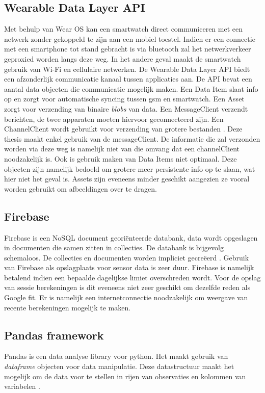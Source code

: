 \subsection{Wearable Data Layer API}
Met behulp van Wear OS kan een smartwatch direct communiceren met een netwerk zonder gekoppeld te zijn aan een mobiel toestel. Indien er een connectie met een smartphone tot stand gebracht is via bluetooth zal het netwerkverkeer geproxied worden langs deze weg. In het andere geval maakt de smartwatch gebruik van Wi-Fi en cellulaire netwerken.
De Wearable Data Layer API biedt een afzonderlijk communicatie kanaal tussen applicaties aan. 
De API bevat een aantal data objecten die communicatie mogelijk maken. Een Data Item slaat info op en zorgt voor automatische syncing tussen gsm en smartwatch. Een Asset zorgt voor verzending van binaire \textit{blobs} van data. Een MessageClient verzendt berichten, de twee apparaten moeten hiervoor geconnecteerd zijn. Een ChannelClient wordt gebruikt voor verzending van grotere bestanden \cite{ref26}.
Deze thesis maakt enkel gebruik van de messageClient. De informatie die zal verzonden worden via deze weg is namelijk niet van die omvang dat een channelClient noodzakelijk is. Ook is gebruik maken van Data Items niet optimaal. Deze objecten zijn namelijk bedoeld om grotere meer persistente info op te slaan, wat hier niet het geval is. Assets zijn eveneens minder geschikt aangezien ze vooral worden gebruikt om afbeeldingen over te dragen.

\subsection{Firebase}
Firebase is een NoSQL document georiënteerde databank, data wordt opgeslagen in documenten die samen zitten in collecties. De databank is bijgevolg schemaloos. De collecties en documenten worden impliciet gecreëerd \cite{ref61}.
Gebruik van Firebase als opslagplaats voor sensor data is zeer duur. Firebase is namelijk betalend indien een bepaalde dagelijkse limiet overschreden wordt. Voor de opslag van sessie berekeningen is dit eveneens niet zeer geschikt om dezelfde reden als Google fit. Er is namelijk een internetconnectie noodzakelijk om weergave van recente berekeningen mogelijk te maken.

\subsection{Pandas framework}
Pandas is een data analyse library voor python. Het maakt gebruik van \textit{dataframe} objecten voor data manipulatie. Deze datastructuur maakt het mogelijk om de data voor te stellen in rijen van observaties en kolommen van variabelen \cite{ref27}.

